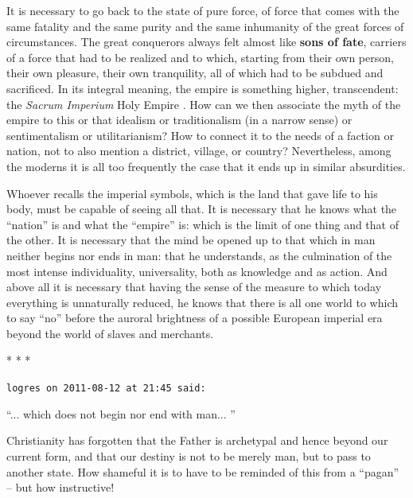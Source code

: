 It is necessary to go back to the state of pure force, of force that comes with the same fatality and the same purity and the same inhumanity of the great forces of circumstances. The great conquerors always felt almost like \textbf{sons of fate}, carriers of a force that had to be realized and to which, starting from their own person, their own pleasure, their own tranquility, all of which had to be subdued and sacrificed. In its integral meaning, the empire is something higher, transcendent: the \emph{Sacrum Imperium} Holy Empire . How can we then associate the myth of the empire to this or that idealism or traditionalism (in a narrow sense) or sentimentalism or utilitarianism? How to connect it to the needs of a faction or nation, not to also mention a district, village, or country? Nevertheless, among the moderns it is all too frequently the case that it ends up in similar absurdities.

Whoever recalls the imperial symbols, which is the land that gave life to his body, must be capable of seeing all that. It is necessary that he knows what the ``nation'' is and what the ``empire'' is: which is the limit of one thing and that of the other. It is necessary that the mind be opened up to that which in man neither begins nor ends in man: that he understands, as the culmination of the most intense individuality, universality, both as knowledge and as action. And above all it is necessary that having the sense of the measure to which today everything is unnaturally reduced, he knows that there is all one world to which to say ``no'' before the auroral brightness of a possible European imperial era beyond the world of slaves and merchants.



\begin{center}* * *\end{center}

\begin{footnotesize}
\begin{sffamily}
\texttt{logres on 2011-08-12 at 21:45 said:}

``... which does not begin nor end with man... ''

Christianity has forgotten that the Father is archetypal and hence beyond our current form, and that our destiny is not to be merely man, but to pass to another state. How shameful it is to have to be reminded of this from a ``pagan'' -- but how instructive!


\hfill

\end{sffamily}
\end{footnotesize}

